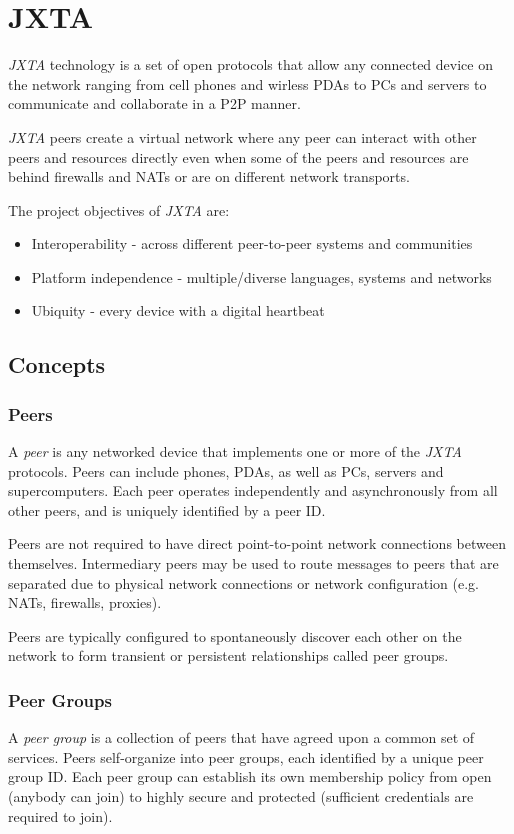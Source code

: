 \section{JXTA}
\emph{JXTA} technology is a set of open protocols that allow any connected device on the network ranging from cell phones and wirless PDAs to PCs and servers to communicate and collaborate in a P2P manner.

\emph{JXTA} peers create a virtual network where any peer can interact with other peers and resources directly even when some of the peers and resources are behind firewalls and NATs or are on different network transports.

The project objectives of \emph{JXTA} are:
\begin{itemize}
 \item Interoperability - across different peer-to-peer systems and communities
 \item Platform independence - multiple/diverse languages, systems and networks
 \item Ubiquity - every device with a digital heartbeat
\end{itemize}


\subsection{Concepts}

\subsubsection{Peers}
A \emph{peer} is any networked device that implements one or more of the \emph{JXTA} protocols. Peers can include phones, PDAs, as well as PCs, servers and supercomputers. Each peer operates independently and asynchronously from all other peers, and is uniquely identified by a peer ID.

Peers are not required to have direct point-to-point network connections between themselves. Intermediary peers may be used to route messages to peers that are separated due to physical network connections or network configuration (e.g. NATs, firewalls, proxies).

Peers are typically configured to spontaneously discover each other on the network to form transient or persistent relationships called peer groups.

\subsubsection{Peer Groups}
A \emph{peer group} is a collection of peers that have agreed upon a common set of services. Peers self-organize into peer groups, each identified by a unique peer group ID. Each peer group can establish its own membership policy from open (anybody can join) to highly secure and protected (sufficient credentials are required to join).

